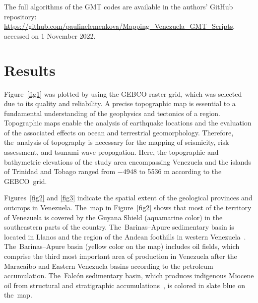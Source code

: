 \documentclass[sustainability,article,accept,pdftex,moreauthors]{Definitions/mdpi}
\begin{document}
The full algorithms of the GMT codes are available in the authors' GitHub repository:\\ \href{https://github.com/paulinelemenkova/Mapping_Venezuela_GMT_Scripts}{https://github.com/paulinelemenkova/Mapping\_Venezuela\_GMT\_Scripts}, accessed on 1 November 2022. %


\section{Results}

Figure~\ref{fig1} was plotted by using the GEBCO raster grid, which was selected due to its quality and reliability.{ A }precise topographic{ map is essential to a fundamental }understanding of the geophysics and tectonics {of a region. Topographic maps enable the analysis of earthquake locations and the evaluation of the }associated effects on ocean and terrestrial geomorphology. {Therefore, the~analysis of  topography is necessary for} the mapping of seismicity, risk assessment, and tsunami wave propagation. Here, the topographic and bathymetric elevations of the study area encompassing Venezuela and the islands of Trinidad and Tobago  ranged from $-$4948 to 5536 m{ }according to the GEBCO~grid. 



Figures~\ref{fig2} and \ref{fig3} indicate the spatial extent of the geological provinces and outcrops in Venezuela. The~map in Figure~\ref{fig2} shows that most of the territory of Venezuela is covered by {the }Guyana Shield (aquamarine color) in the southeastern parts of the country. The~Barinas--Apure sedimentary basin is located in{ }Llanos{ }and the region of the Andean foothills{ in }western Venezuela~\cite{Callejon}. The~Barinas--Apure basin (yellow color on the map) includes oil fields{, which comprise }the third most important  area of production in Venezuela after the Maracaibo and Eastern Venezuela basins{ }according to the petroleum accumulation. The~Falcón sedimentary basin, which produces indigenous Miocene oil from structural and stratigraphic accumulations~\cite{Rodriguez}{, }is colored in slate blue on the~map. 
\end{document}
